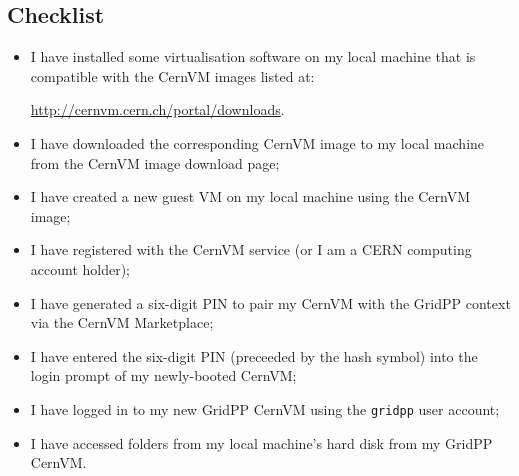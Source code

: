 \subsection{Checklist}
\label{creating-a-grid-ui-with-a-gridpp-cernvm---checklist}

\begin{itemize}
\tightlist
\item
  I have installed some virtualisation software on my local machine that
  is compatible with the CernVM images listed at:

  \url{http://cernvm.cern.ch/portal/downloads}.
\item
  I have downloaded the corresponding CernVM image to my local machine
  from the CernVM image download page;
\item
  I have created a new guest VM on my local machine using the CernVM
  image;
\item
  I have registered with the CernVM service
  (or I am a CERN computing account holder);
\item
  I have generated a six-digit PIN to pair my CernVM with the GridPP
  context via the CernVM Marketplace;
\item
  I have entered the six-digit PIN (preceeded by the hash symbol) into
  the login prompt of my newly-booted CernVM;
\item
  I have logged in to my new GridPP CernVM using the \texttt{gridpp}
  user account;
\item
  I have accessed folders from my local machine's hard disk from my
  GridPP CernVM.
\end{itemize}
